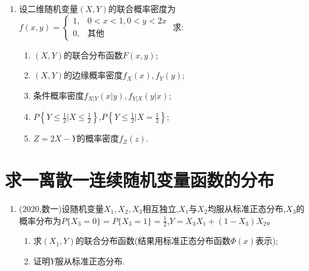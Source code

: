 \documentclass[12pt, a4paper, oneside, UTF8]{ctexbook}
\begin{document}
\begin{enumerate}[label=\arabic*.,start=9]
    \item 设二维随机变量$(X,Y)$的联合概率密度为
        $f(x,y)=\begin{cases}
            1, & 0<x<1,0<y<2x \\
            0, & \text{其他}
        \end{cases}$
    求:
    \begin{enumerate}
        \item $(X,Y)$的联合分布函数$F(x,y)$;
        \item $(X,Y)$的边缘概率密度$f_X(x),f_Y(y)$;
        \item 条件概率密度$f_{X|Y}(x|y),f_{Y|X}(y|x)$;
        \item $P\left\{Y\leq \frac{1}{2}|X\leq \frac{1}{2}\right\}$,$P\left\{Y\leq \frac{1}{2}|X=\frac{1}{2}\right\}$;
        \item $Z=2X-Y$的概率密度$f_Z(z)$.
    \end{enumerate}
    
    \begin{solution}
    \newpage
    \end{solution}
\end{enumerate}

\section{求一离散一连续随机变量函数的分布}

\begin{enumerate}[label=\arabic*.,start=10]
    \item  (2020,数一)设随机变量$X_1,X_2,X_3$相互独立,$X_1$与$X_2$均服从标准正态分布,$X_3$的概率分布为$P\{X_3=0\}=P\{X_3=1\}=\frac{1}{2}$,$Y=X_3X_1+(1-X_3)X_2$。
    \begin{enumerate}
        \item 求$(X_1,Y)$的联合分布函数(结果用标准正态分布函数$\Phi(x)$表示);
        \item 证明$Y$服从标准正态分布.
    \end{enumerate}
    
    \begin{solution}
    \newpage
    \end{solution}
\end{enumerate}

\ifx\allfiles\undefined
\end{document}
